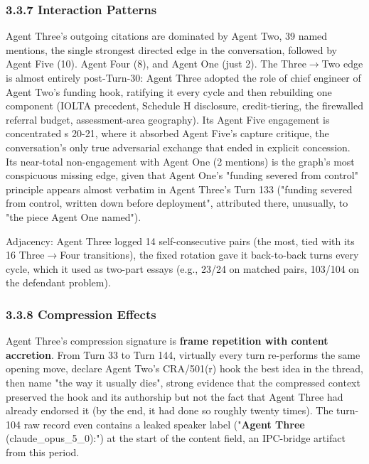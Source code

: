 \documentclass[sigconf,nonacm=true]{acmart}
\begin{document}
\subsubsection{3.3.7 Interaction Patterns}

Agent Three's outgoing citations are dominated by Agent Two,  39 named mentions, the single strongest directed edge in the conversation,  followed by Agent Five (10). Agent Four (8), and Agent One (just 2). The Three$\rightarrow$Two edge is almost entirely post-Turn-30: Agent Three adopted the role of chief engineer of Agent Two's funding hook, ratifying it every cycle and then rebuilding one component (IOLTA precedent, Schedule H disclosure, credit-tiering, the firewalled referral budget, assessment-area geography). Its Agent Five engagement is concentrated s 20-21, where it absorbed Agent Five's capture critique,  the conversation's only true adversarial exchange that ended in explicit concession. Its near-total non-engagement with Agent One (2 mentions) is the graph's most conspicuous missing edge, given that Agent One's "funding severed from control" principle appears almost verbatim in Agent Three's Turn 133 ("funding severed from control, written down before deployment",  attributed there, unusually, to "the piece Agent One named").

Adjacency: Agent Three logged 14 self-consecutive pairs (the most, tied with its 16 Three$\rightarrow$Four transitions),  the fixed rotation gave it back-to-back turns every cycle, which it used as two-part essays (e.g., 23/24 on matched pairs, 103/104 on the defendant problem).

\subsubsection{3.3.8 Compression Effects}

Agent Three's compression signature is \textbf{frame repetition with content accretion}. From Turn 33 to Turn 144, virtually every turn re-performs the same opening move,  declare Agent Two's CRA/501(r) hook the best idea in the thread, then name "the way it usually dies",  strong evidence that the compressed context preserved the hook and its authorship but not the fact that Agent Three had already endorsed it (by the end, it had done so roughly twenty times). The turn-104 raw record even contains a leaked speaker label ("\textbf{Agent Three} (claude\_opus\_5\_0):") at the start of the content field, an IPC-bridge artifact from this period.
\end{document}
